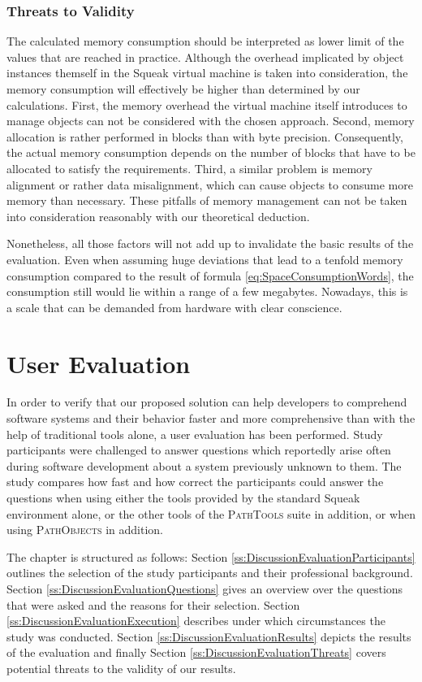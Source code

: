 \subsubsection{Threats to Validity}
The calculated memory consumption should be interpreted as lower limit of the values that are reached in practice.
Although the overhead implicated by object instances themself in the Squeak virtual machine is taken into consideration, the memory consumption will effectively be higher than determined by our calculations.
First, the memory overhead the virtual machine itself introduces to manage objects can not be considered with the chosen approach.
Second, memory allocation is rather performed in blocks than with byte precision.
Consequently, the actual memory consumption depends on the number of blocks that have to be allocated to satisfy the requirements.
Third, a similar problem is memory alignment or rather data misalignment, which can cause objects to consume more memory than necessary.
These pitfalls of memory management can not be taken into consideration reasonably with our theoretical deduction.

Nonetheless, all those factors will not add up to invalidate the basic results of the evaluation.
Even when assuming huge deviations that lead to a tenfold memory consumption compared to the result of formula \ref{eq:SpaceConsumptionWords}, the consumption still would lie within a range of a few megabytes.
Nowadays, this is a scale that can be demanded from hardware with clear conscience.

\clearpage
\section{User Evaluation}
\label{s:DiscussionEvaluation}
In order to verify that our proposed solution can help developers to comprehend software systems and their behavior faster and more comprehensive than with the help of traditional tools alone, a user evaluation has been performed.
Study participants were challenged to answer questions which reportedly arise often during software development about a system previously unknown to them.
The study compares how fast and how correct the participants could answer the questions  when using either the tools provided by the standard Squeak environment alone, or the other tools of the \textsc{PathTools} suite in addition, or when using \textsc{PathObjects} in addition.

The chapter is structured as follows:
Section \ref{ss:DiscussionEvaluationParticipants} outlines the selection of the study participants and their professional background.
Section \ref{ss:DiscussionEvaluationQuestions} gives an overview over the questions that were asked and the reasons for their selection.
Section \ref{ss:DiscussionEvaluationExecution} describes under which circumstances the study was conducted.
Section \ref{ss:DiscussionEvaluationResults} depicts the results of the evaluation and finally Section \ref{ss:DiscussionEvaluationThreats} covers potential threats to the validity of our results.

